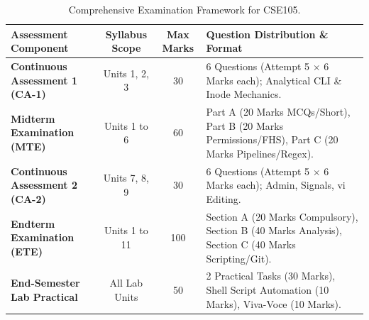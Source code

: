 \begin{table}[htbp]
\centering
\small
\begin{tabularx}{\linewidth}{l c c X}
\toprule
\textbf{Assessment Component} & \textbf{Syllabus Scope} & \textbf{Max Marks} & \textbf{Question Distribution \& Format} \\
\midrule
\textbf{Continuous Assessment 1 (CA-1)} & Units 1, 2, 3 & 30 & 6 Questions (Attempt 5 $\times$ 6 Marks each); Analytical CLI \& Inode Mechanics. \\
\textbf{Midterm Examination (MTE)} & Units 1 to 6 & 60 & Part A (20 Marks MCQs/Short), Part B (20 Marks Permissions/FHS), Part C (20 Marks Pipelines/Regex). \\
\textbf{Continuous Assessment 2 (CA-2)} & Units 7, 8, 9 & 30 & 6 Questions (Attempt 5 $\times$ 6 Marks each); Admin, Signals, vi Editing. \\
\textbf{Endterm Examination (ETE)} & Units 1 to 11 & 100 & Section A (20 Marks Compulsory), Section B (40 Marks Analysis), Section C (40 Marks Scripting/Git). \\
\textbf{End-Semester Lab Practical} & All Lab Units & 50 & 2 Practical Tasks (30 Marks), Shell Script Automation (10 Marks), Viva-Voce (10 Marks). \\
\bottomrule
\end{tabularx}
\caption{Comprehensive Examination Framework for CSE105.}
\end{table}
